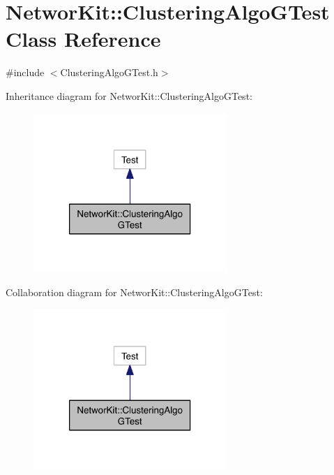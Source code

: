 \hypertarget{class_networ_kit_1_1_clustering_algo_g_test}{\section{Networ\-Kit\-:\-:Clustering\-Algo\-G\-Test Class Reference}
\label{class_networ_kit_1_1_clustering_algo_g_test}
}


{\ttfamily \#include $<$Clustering\-Algo\-G\-Test.\-h$>$}



Inheritance diagram for Networ\-Kit\-:\-:Clustering\-Algo\-G\-Test\-:\nopagebreak
\begin{figure}[H]
\begin{center}
\leavevmode
\includegraphics[width=208pt]{class_networ_kit_1_1_clustering_algo_g_test__inherit__graph}
\end{center}
\end{figure}


Collaboration diagram for Networ\-Kit\-:\-:Clustering\-Algo\-G\-Test\-:\nopagebreak
\begin{figure}[H]
\begin{center}
\leavevmode
\includegraphics[width=208pt]{class_networ_kit_1_1_clustering_algo_g_test__coll__graph}
\end{center}
\end{figure}


